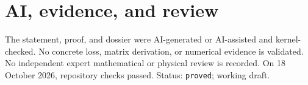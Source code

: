 \documentclass[11pt]{article}
\begin{document}
\section{AI, evidence, and review}
The statement, proof, and dossier were AI-generated or AI-assisted and kernel-checked.
No concrete loss, matrix derivation, or numerical evidence is validated. No independent
expert mathematical or physical review is recorded. On 18 October 2026, repository
checks passed. Status: \texttt{proved}; working draft.
\end{document}
